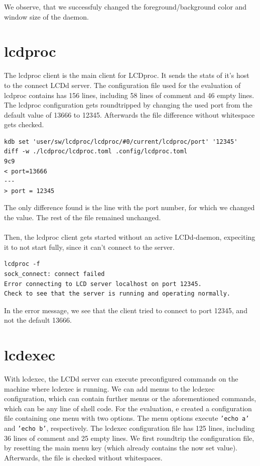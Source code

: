 \documentclass[draft,final]{vutinfth} %
\begin{document}
\FloatBarrier
We observe, that we successfuly changed the foreground/background color and window size of the daemon.

\section{lcdproc}
The lcdproc client is the main client for LCDproc. It sends the stats of it's host to the connect LCDd server.
The configuration file used for the evaluation of lcdproc contains has 156 lines, including 58 lines of comment and 46 empty lines.
The lcdproc configuration gets roundtripped by changing the used port from the default value of 13666 to 12345.
Afterwards the file difference without whitespace gets checked.
\begin{Verbatim}[frame=single, fontsize=\small]
kdb set 'user/sw/lcdproc/lcdproc/#0/current/lcdproc/port' '12345'
diff -w ./lcdproc/lcdproc.toml .config/lcdproc.toml
9c9
< port=13666
---
> port = 12345
\end{Verbatim}

The only difference found is the line with the port number, for which we changed the value.
The rest of the file remained unchanged.
\\\\
Then, the lcdproc client gets started without an active LCDd-daemon, expeciting it to not start fully, since it can't connect to the server.

\begin{Verbatim}[frame=single, fontsize=\small]
lcdproc -f
sock_connect: connect failed
Error connecting to LCD server localhost on port 12345.
Check to see that the server is running and operating normally.
\end{Verbatim}
In the error message, we see that the client tried to connect to port 12345, and not the default 13666.

\section{lcdexec}
With lcdexec, the LCDd server can execute preconfigured commands on the machine where lcdexec is running.
We can add menus to the lcdexec configuration, which can contain further menus or the aforementioned commands, which can be any line of shell code.
For the evaluation, e created a configuration file containing one menu with two options.
The menu options execute \texttt{'echo a'} and \texttt{'echo b'}, respectively.
The lcdexec configuration file has 125 lines, including 36 lines of comment and 25 empty lines.
We first roundtrip the configuration file, by resetting the main menu key (which already contains the now set value).
Afterwards, the file is checked without whitespaces.
\end{document}
